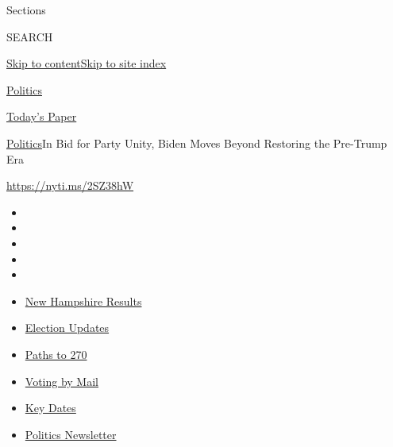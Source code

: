 Sections

SEARCH

\protect\hyperlink{site-content}{Skip to
content}\protect\hyperlink{site-index}{Skip to site index}

\href{https://www.nytimes3xbfgragh.onion/section/politics}{Politics}

\href{https://myaccount.nytimes3xbfgragh.onion/auth/login?response_type=cookie\&client_id=vi}{}

\href{https://www.nytimes3xbfgragh.onion/section/todayspaper}{Today's
Paper}

\href{/section/politics}{Politics}\textbar{}In Bid for Party Unity,
Biden Moves Beyond Restoring the Pre-Trump Era

\url{https://nyti.ms/2SZ38hW}

\begin{itemize}
\item
\item
\item
\item
\item
\end{itemize}

\begin{itemize}
\item
  \href{https://www.nytimes3xbfgragh.onion/interactive/2020/09/08/us/elections/results-new-hampshire-primary-elections.html?action=click\&pgtype=Article\&state=default\&region=TOP_BANNER\&context=storylines_menu}{New
  Hampshire Results}
\item
  \href{https://www.nytimes3xbfgragh.onion/live/2020/09/09/us/trump-vs-biden?action=click\&pgtype=Article\&state=default\&region=TOP_BANNER\&context=storylines_menu}{Election
  Updates}
\item
  \href{https://www.nytimes3xbfgragh.onion/interactive/2020/us/elections/election-states-biden-trump.html?action=click\&pgtype=Article\&state=default\&region=TOP_BANNER\&context=storylines_menu}{Paths
  to 270}
\item
  \href{https://www.nytimes3xbfgragh.onion/interactive/2020/08/31/us/politics/vote-by-mail-deadlines.html?action=click\&pgtype=Article\&state=default\&region=TOP_BANNER\&context=storylines_menu}{Voting
  by Mail}
\item
  \href{https://www.nytimes3xbfgragh.onion/interactive/2019/us/elections/2020-presidential-election-calendar.html?action=click\&pgtype=Article\&state=default\&region=TOP_BANNER\&context=storylines_menu}{Key
  Dates}
\item
  \href{https://www.nytimes3xbfgragh.onion/newsletters/politics?action=click\&pgtype=Article\&state=default\&region=TOP_BANNER\&context=storylines_menu}{Politics
  Newsletter}
\end{itemize}

